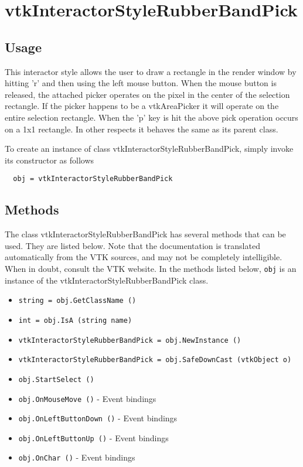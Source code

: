 \section{vtkInteractorStyleRubberBandPick}

\subsection{Usage}

 This interactor style allows the user to draw a rectangle in the render
 window by hitting 'r' and then using the left mouse button.  
 When the mouse button is released, the attached picker operates on the pixel
 in the center of the selection rectangle. If the picker happens to be a 
 vtkAreaPicker it will operate on the entire selection rectangle.
 When the 'p' key is hit the above pick operation occurs on a 1x1 rectangle.
 In other respects it behaves the same as its parent class.


To create an instance of class vtkInteractorStyleRubberBandPick, simply
invoke its constructor as follows
\begin{verbatim}
  obj = vtkInteractorStyleRubberBandPick
\end{verbatim}
\subsection{Methods}

The class vtkInteractorStyleRubberBandPick has several methods that can be used.
  They are listed below.
Note that the documentation is translated automatically from the VTK sources,
and may not be completely intelligible.  When in doubt, consult the VTK website.
In the methods listed below, \verb|obj| is an instance of the vtkInteractorStyleRubberBandPick class.
\begin{itemize}
\item  \verb|string = obj.GetClassName ()|

\item  \verb|int = obj.IsA (string name)|

\item  \verb|vtkInteractorStyleRubberBandPick = obj.NewInstance ()|

\item  \verb|vtkInteractorStyleRubberBandPick = obj.SafeDownCast (vtkObject o)|

\item  \verb|obj.StartSelect ()|

\item  \verb|obj.OnMouseMove ()| -  Event bindings

\item  \verb|obj.OnLeftButtonDown ()| -  Event bindings

\item  \verb|obj.OnLeftButtonUp ()| -  Event bindings

\item  \verb|obj.OnChar ()| -  Event bindings

\end{itemize}
